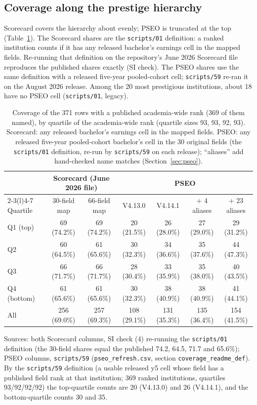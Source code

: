 \documentclass[11pt]{article}
\newcommand{\scr}[1]{\texttt{scripts/#1}}
\begin{document}
\subsection{Coverage along the prestige hierarchy}\label{sec:coverage}

Scorecard covers the hierarchy about evenly; PSEO is truncated at the top (Table~\ref{tab:coverage}). The
Scorecard shares are the \scr{01} definition: a ranked institution counts if it has any released bachelor's
earnings cell in the mapped fields. Re-running that definition on the repository's June 2026 Scorecard file
reproduces the published shares exactly (SI check). The PSEO shares use the same definition with a released
five-year pooled-cohort cell; \scr{59} re-ran it on the August 2026 release. Among the 20 most prestigious
institutions, about 18 have no PSEO cell (\scr{01}, legacy).

\begin{table}[!tbp]
\centering
\caption{Coverage of the 371 rows with a published academia-wide rank (369 of them named), by quartile of the
academia-wide rank (quartile sizes 93, 93, 92, 93). Scorecard: any released bachelor's earnings cell in the
mapped fields. PSEO: any released five-year pooled-cohort bachelor's cell in the 30 original fields (the
\scr{01} definition, re-run by \scr{59} on each release); ``aliases'' add hand-checked name matches
(Section~\ref{sec:pseo}).}\label{tab:coverage}
\footnotesize
\begin{tabular}{@{}lcccccc@{}}
\toprule
 & \multicolumn{2}{c}{Scorecard (June 2026 file)} & \multicolumn{4}{c}{PSEO} \\
\cmidrule(lr){2-3}\cmidrule(l){4-7}
Quartile & 30-field map & 66-field map & V4.13.0 & V4.14.1 & + 4 aliases & + 23 aliases \\
\midrule
Q1 (top) & 69 (74.2\%) & 69 (74.2\%) & 20 (21.5\%) & 26 (28.0\%) & 27 (29.0\%) & 29 (31.2\%) \\
Q2 & 60 (64.5\%) & 61 (65.6\%) & 30 (32.3\%) & 34 (36.6\%) & 35 (37.6\%) & 44 (47.3\%) \\
Q3 & 66 (71.7\%) & 66 (71.7\%) & 28 (30.4\%) & 33 (35.9\%) & 35 (38.0\%) & 40 (43.5\%) \\
Q4 (bottom) & 61 (65.6\%) & 61 (65.6\%) & 30 (32.3\%) & 38 (40.9\%) & 38 (40.9\%) & 41 (44.1\%) \\
All & 256 (69.0\%) & 257 (69.3\%) & 108 (29.1\%) & 131 (35.3\%) & 135 (36.4\%) & 154 (41.5\%) \\
\bottomrule
\end{tabular}

\smallskip
\begin{minipage}{0.97\textwidth}\footnotesize
Sources: both Scorecard columns, SI check (4) re-running the \scr{01} definition (the 30-field shares equal the
published 74.2, 64.5, 71.7 and 65.6\%); PSEO
columns, \scr{59} (\texttt{pseo\_refresh.csv}, section \texttt{coverage\_readme\_def}). By the \scr{59} definition (a usable released y5 cell whose field has a published field rank at that
institution; 369 ranked institutions, quartiles 93/92/92/92) the top-quartile counts are 20 (V4.13.0) and 26
(V4.14.1), and the bottom-quartile counts 30 and 35.
\end{minipage}
\end{table}
\end{document}
